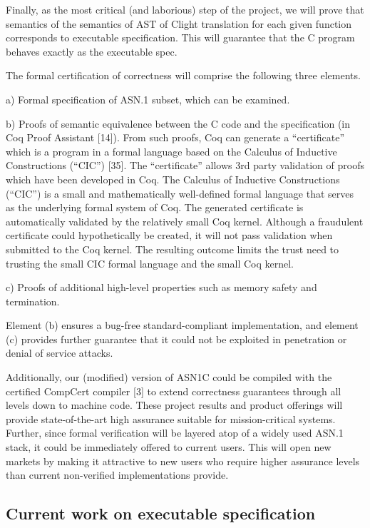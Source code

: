 \documentclass[acmsmall,nonacm]{acmart}
\begin{document}
Finally, as the most critical (and laborious) step of the project, we will prove that semantics of the semantics of AST of Clight translation for each given function corresponds to executable specification. This will guarantee that the C program behaves exactly as the executable spec.

The formal certification of correctness will comprise the following three elements.

a) Formal specification of ASN.1 subset, which can be examined. 

b) Proofs of semantic equivalence between the C code and the specification (in Coq Proof Assistant [14]). From such proofs, Coq can generate a ``certificate''  which is a program in a formal language based on the Calculus of Inductive Constructions (``CIC'') [35]. The ``certificate'' allows 3rd party validation of proofs which have been developed in Coq. The Calculus of Inductive Constructions (``CIC'') is a small and mathematically well-defined formal language that serves as the underlying formal system of Coq. The generated certificate is automatically validated by the relatively small Coq kernel. Although a fraudulent certificate could hypothetically be created, it will not pass validation when submitted to the Coq kernel. The resulting outcome limits the trust need to trusting the small CIC formal language and the small Coq kernel. 

c) Proofs of additional high-level properties such as memory safety and termination. 

Element (b) ensures a bug-free standard-compliant implementation, and element (c) provides further guarantee that it could not be exploited in penetration or denial of service attacks.

Additionally, our (modified) version of ASN1C could be compiled with the certified CompCert compiler [3] to extend correctness guarantees through all levels down to machine code. These project results and product offerings will provide state-of-the-art high assurance suitable for mission-critical systems. Further, since formal verification will be layered atop of a widely used ASN.1 stack, it could be immediately offered to current users. This will open new markets by making it attractive to new users who require higher assurance levels than current non-verified implementations provide.

\subsection{Current work on executable specification}
\end{document}
